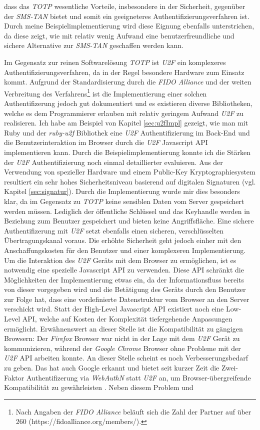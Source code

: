 \documentclass[11pt,a4paper,ngerman]{scrreprt}
\begin{document}
dass das \textit{TOTP} wesentliche Vorteile, insbesondere in der Sicherheit, gegenüber der \textit{SMS-TAN} bietet und somit ein geeigneteres Authentifizierungsverfahren ist. Durch meine Beispielimplementierung wird diese Eignung ebenfalls unterstrichen, da diese zeigt, wie mit relativ wenig Aufwand eine benutzerfreundliche und sichere Alternative zur \textit{SMS-TAN} geschaffen werden kann.

Im Gegensatz zur reinen Softwarelösung \textit{TOTP} ist \textit{U2F} ein komplexeres Authentifizierungsverfahren, da in der Regel besondere Hardware zum Einsatz kommt. Aufgrund der Standardisierung durch die \textit{FIDO Alliance} und der weiten Verbreitung des Verfahrens\footnote{Nach Angaben der \textit{FIDO Alliance} beläuft sich die Zahl der Partner auf über 260 (https://fidoalliance.org/members/).} ist die Implementierung einer solchen Authentifizerung jedoch gut dokumentiert und es existieren diverse Bibliotheken, welche es dem Programmierer erlauben mit relativ geringem Aufwand \textit{U2F} zu realisieren. Ich habe am Beispiel von Kapitel \ref{sec:u2fImpl} gezeigt, wie man mit Ruby und der \textit{ruby-u2f} Bibliothek eine \textit{U2F} Authentifizierung im Back-End und die Benutzerinteraktion im Browser durch die \textit{U2F} Javascript API implementieren kann. Durch die Beispielimplementierung konnte ich die Stärken der \textit{U2F} Authentifizierung noch einmal detaillierter evaluieren. Aus der Verwendung von spezieller Hardware und einem Public-Key Kryptographiesystem resultiert ein sehr hohes Sicherheitsniveau basierend auf digitalen Signaturen (vgl. Kapitel \ref{sec:signatur}). Durch die Implementierung wurde mir dies besonders klar, da im Gegensatz zu \textit{TOTP} keine sensiblen Daten vom Server gespeichert werden müssen. Lediglich der öffentliche Schlüssel und das Keyhandle werden in Beziehung zum Benutzer gespeichert und bieten keine Angriffsfläche. Eine sichere Authentifizerung mit \textit{U2F} setzt ebenfalls einen sicheren, verschlüsselten Übertragungskanal voraus. Die erhöhte Sicherheit geht jedoch einher mit den Anschaffungskosten für den Benutzer und einer komplexeren Implementierung. Um die Interaktion des \textit{U2F} Geräts mit dem Browser zu ermöglichen, ist es notwendig eine spezielle Javascript API zu verwenden. Diese API schränkt die Möglichkeiten der Implementierung etwas ein, da der Informationsfluss bereits von dieser vorgegeben wird und die Betätigung des Geräts durch den Benutzer zur Folge hat, dass eine vordefinierte Datenstruktur vom Browser an den Server verschickt wird. Statt der High-Level Javascript API existiert noch eine Low-Level API, welche auf Kosten der Komplexität tiefergehende Anpassungen ermöglicht. Erwähnenswert an dieser Stelle ist die Kompatibilität zu gängigen Browsern: Der \textit{Firefox} Browser war nicht in der Lage mit dem \textit{U2F} Gerät zu kommunizieren, während der \textit{Google Chrome} Browser ohne Probleme mit der \textit{U2F} API arbeiten konnte. An dieser Stelle scheint es noch Verbesserungsbedarf zu geben. Das hat auch Google erkannt und bietet seit kurzer Zeit die Zwei-Faktor Authentifizerung via \textit{WebAuthN} statt \textit{U2F} an, um Browser-übergreifende Kompatibilität zu gewährleisten \cite{heiseWebAuthN, w3cWebAuthN}. Neben diesem Problem und 
\end{document}
